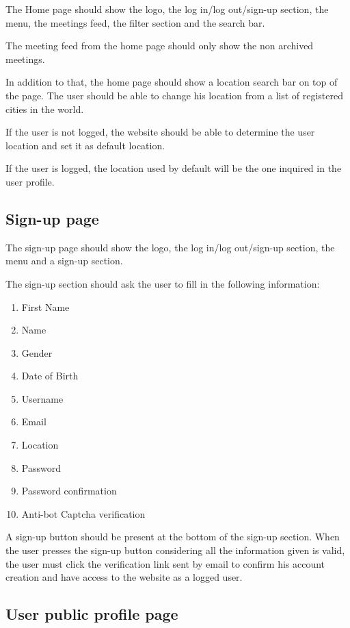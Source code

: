 \documentclass[conference]{IEEEtran}
\begin{document}
The Home page should show the logo, the log in/log out/sign-up section, the menu, the meetings feed, the filter section and the search bar.

The meeting feed from the home page should only show the non archived meetings.

In addition to that, the home page should show a location search bar on top of the page. 
The user should be able to change his location from a list of registered cities in the world.

If the user is not logged, the website should be able to determine the user location and set it as default location.

If the user is logged, the location used by default will be the one inquired in the user profile.

\subsection{Sign-up page}

The sign-up page should show the logo, the log in/log out/sign-up section, the menu and a sign-up section.

The sign-up section should ask the user to fill in the following information:

\begin{enumerate}
    \item First Name
    \item Name
    \item Gender
    \item Date of Birth
    \item Username
    \item Email
    \item Location
    \item Password
    \item Password confirmation
    \item Anti-bot Captcha verification
\end{enumerate}

A sign-up button should be present at the bottom of the sign-up section. 
When the user presses the sign-up button considering all the information given is valid, the user must click the verification link sent by email to confirm his account creation and have access to the website as a logged user.

\subsection{User public profile page}
\end{document}
